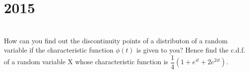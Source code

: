 \section*{2015}
\vspace{-.5cm}
\hrulefill \smallskip\\
 How can you find out the discontinuity points of a distributon of a random variable if the characteristic function $\phi(t)$ is given to you? Hence find the  c.d.f. of a random variable X whose characteristic function is $\dfrac{1}{4}(1 + e^{it} + 2e^{2it})$.